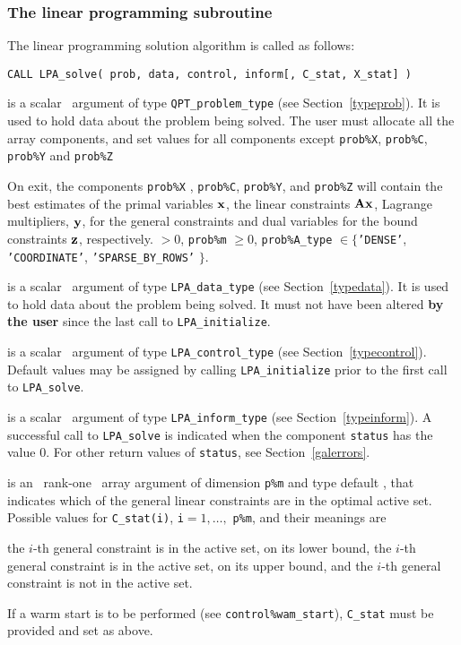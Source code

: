\documentclass{galahad}
\newcommand{\packagename}{LPA}
\begin{document}

\subsubsection{The linear programming subroutine}\label{qps}
The linear programming solution algorithm is called as follows:
\vspace*{1mm}

\hspace{8mm}
{\tt CALL \packagename\_solve( prob, data, control, inform[, C\_stat, X\_stat] )}

\begin{description}
 is a scalar \intentinout\ argument of type
{\tt QPT\_problem\_type}
(see Section~\ref{typeprob}).
It is used to hold data about the problem being solved.
The user must allocate all the array components,
and set values for all components except {\tt prob\%X}, {\tt prob\%C},
{\tt prob\%Y} and {\tt prob\%Z}

On exit, the components {\tt prob\%X} , {\tt prob\%C}, {\tt prob\%Y},
and {\tt prob\%Z}
will contain the best estimates of the primal variables ${\mathbf{x}}$,
the linear constraints ${\mathbf{A}} {\mathbf{x}}$,
Lagrange multipliers, ${\mathbf{y}}$, for the general constraints
and dual variables for the bound constraints ${\mathbf{z}}$, respectively.
 $> 0$, {\tt prob\%m} $\geq 0$,
 {\tt prob\%A\_type} $\in \{${\tt 'DENSE'},
 {\tt 'COORDINATE'}, {\tt 'SPARSE\_BY\_\-ROWS'} $\}$.

 is a scalar \intentinout\ argument of type
{\tt \packagename\_data\_type}
(see Section~\ref{typedata}). It is used to hold data about the problem being
solved. It must not have been altered {\bf by the user} since the last call to
{\tt \packagename\_initialize}.

 is a scalar \intentin\ argument of type
{\tt \packagename\_control\_type}
(see Section~\ref{typecontrol}). Default values may be assigned by calling
{\tt \packagename\_initialize} prior to the first call to
{\tt \packagename\_solve}.

 is a scalar \intentinout\ argument of type
{\tt \packagename\_inform\_type}
(see Section~\ref{typeinform}).
A successful call to
{\tt \packagename\_solve}
is indicated when the  component {\tt status} has the value 0.
For other return values of {\tt status}, see Section~\ref{galerrors}.

 is an \optional\ rank-one \intentout\ array argument of
dimension {\tt p\%m}
and type default \integer, that indicates which of the general linear
constraints are in the optimal active set. Possible values for
{\tt C\_stat(i)}, {\tt i}$=1, \ldots ,$ {\tt p\%m}, and their meanings are
\begin{description}
 the $i$-th general constraint
is in the active set, on its lower bound,
 the $i$-th general constraint
is in the active set, on its upper bound, and
  the $i$-th general constraint is not in the active set.
\end{description}
If a warm start is to be performed (see {\tt control\%wam\_start}),
{\tt C\_stat} must be provided and set as above.


\end{description}
\end{document}
